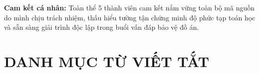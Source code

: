 \documentclass[14pt,a4paper]{extarticle}
\begin{document}
\vspace{0.25cm}
\noindent
\textbf{Cam kết cá nhân:} Toàn thể 5 thành viên cam kết nắm vững toàn bộ mã nguồn do mình chịu trách nhiệm, thấu hiểu tường tận chứng minh độ phức tạp toán học và sẵn sàng giải trình độc lập trong buổi vấn đáp bảo vệ đồ án.
\endgroup

\newpage
\thispagestyle{empty}
\tableofcontents

\newpage
\thispagestyle{empty}
\listoffigures

\newpage
\thispagestyle{empty}
\listoftables

\newpage
\thispagestyle{empty}
\section*{DANH MỤC TỪ VIẾT TẮT}
\end{document}
